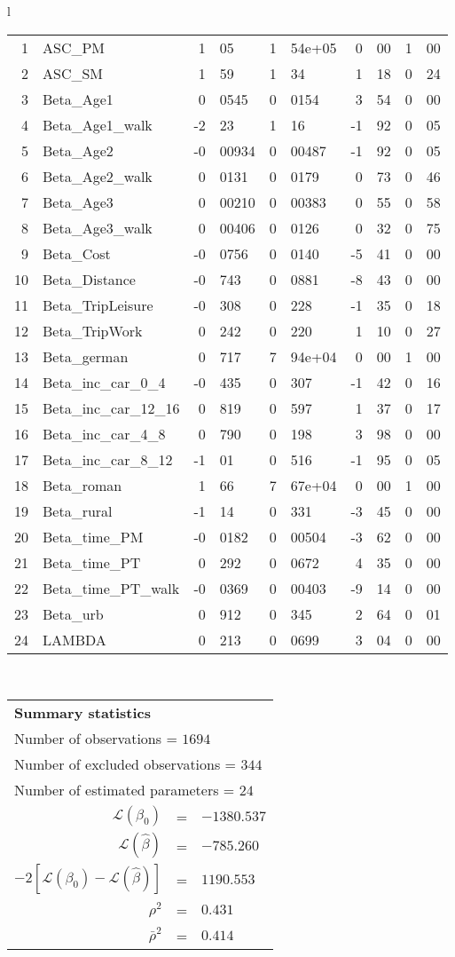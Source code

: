 \begin{tabular}{l}
\begin{tabular}{rlr@{.}lr@{.}lr@{.}lr@{.}l}
1 & ASC_PM  & 1&05 & 1&54e+05 & 0&00 & 1&00\\
2 & ASC_SM & 1&59 & 1&34 & 1&18 & 0&24\\
3 & Beta_Age1 & 0&0545 & 0&0154 & 3&54 & 0&00\\
4 & Beta_Age1_walk & -2&23 & 1&16 & -1&92 & 0&05\\
5 & Beta_Age2 & -0&00934 & 0&00487 & -1&92 & 0&05\\
6 & Beta_Age2_walk & 0&0131 & 0&0179 & 0&73 & 0&46\\
7 & Beta_Age3 & 0&00210 & 0&00383 & 0&55 & 0&58\\
8 & Beta_Age3_walk & 0&00406 & 0&0126 & 0&32 & 0&75\\
9 & Beta_Cost & -0&0756 & 0&0140 & -5&41 & 0&00\\
10 & Beta_Distance & -0&743 & 0&0881 & -8&43 & 0&00\\
11 & Beta_TripLeisure & -0&308 & 0&228 & -1&35 & 0&18\\
12 & Beta_TripWork & 0&242 & 0&220 & 1&10 & 0&27\\
13 & Beta_german & 0&717 & 7&94e+04 & 0&00 & 1&00\\
14 & Beta_inc_car_0_4 & -0&435 & 0&307 & -1&42 & 0&16\\
15 & Beta_inc_car_12_16 & 0&819 & 0&597 & 1&37 & 0&17\\
16 & Beta_inc_car_4_8 & 0&790 & 0&198 & 3&98 & 0&00\\
17 & Beta_inc_car_8_12 & -1&01 & 0&516 & -1&95 & 0&05\\
18 & Beta_roman & 1&66 & 7&67e+04 & 0&00 & 1&00\\
19 & Beta_rural & -1&14 & 0&331 & -3&45 & 0&00\\
20 & Beta_time_PM & -0&0182 & 0&00504 & -3&62 & 0&00\\
21 & Beta_time_PT & 0&292 & 0&0672 & 4&35 & 0&00\\
22 & Beta_time_PT_walk & -0&0369 & 0&00403 & -9&14 & 0&00\\
23 & Beta_urb & 0&912 & 0&345 & 2&64 & 0&01\\
24 & LAMBDA & 0&213 & 0&0699 & 3&04 & 0&00\\
\hline
\end{tabular}
\\
\begin{tabular}{rcl}
\multicolumn{3}{l}{\bf Summary statistics}\\
\multicolumn{3}{l}{ Number of observations = $1694$} \\
\multicolumn{3}{l}{ Number of excluded observations = $344$} \\
\multicolumn{3}{l}{ Number of estimated  parameters = $24$} \\
 $\mathcal{L}(\beta_0)$ &=&  $-1380.537$ \\
 $\mathcal{L}(\hat{\beta})$ &=& $-785.260 $  \\
 $-2[\mathcal{L}(\beta_0) -\mathcal{L}(\hat{\beta})]$ &=& $1190.553$ \\
    $\rho^2$ &=&   $0.431$ \\
    $\bar{\rho}^2$ &=&    $0.414$ \\
\end{tabular}
  \end{tabular}
